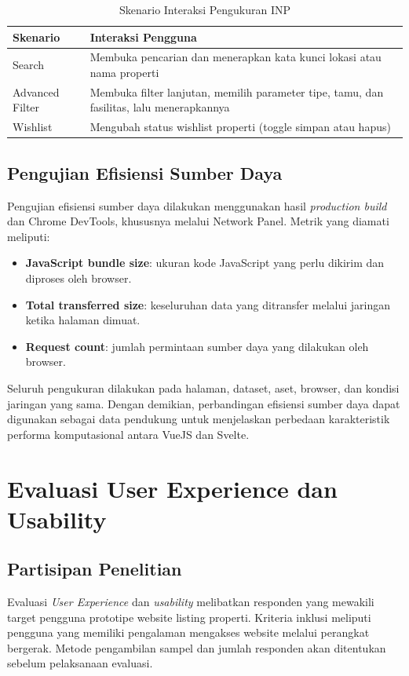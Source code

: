 \documentclass[12pt,a4paper]{report}
\begin{document}
\begin{table}[H]
\centering
\caption{Skenario Interaksi Pengukuran INP}
\label{tab:skenario-inp}
\begin{tabularx}{0.92\textwidth}{|L{3.5cm}|Y|}
\hline
\textbf{Skenario} & \textbf{Interaksi Pengguna} \\
\hline
Search & Membuka pencarian dan menerapkan kata kunci lokasi atau nama properti \\
\hline
Advanced Filter & Membuka filter lanjutan, memilih parameter tipe, tamu, dan fasilitas, lalu menerapkannya \\
\hline
Wishlist & Mengubah status wishlist properti (toggle simpan atau hapus) \\
\hline
\end{tabularx}
\end{table}

\subsection{Pengujian Efisiensi Sumber Daya}
\label{sec:pengujian-efisiensi}
Pengujian efisiensi sumber daya dilakukan menggunakan hasil \textit{production build} dan Chrome DevTools, khususnya melalui Network Panel. Metrik yang diamati meliputi:
\begin{itemize}
    \item \textbf{JavaScript bundle size}: ukuran kode JavaScript yang perlu dikirim dan diproses oleh browser.
    \item \textbf{Total transferred size}: keseluruhan data yang ditransfer melalui jaringan ketika halaman dimuat.
    \item \textbf{Request count}: jumlah permintaan sumber daya yang dilakukan oleh browser.
\end{itemize}

Seluruh pengukuran dilakukan pada halaman, dataset, aset, browser, dan kondisi jaringan yang sama. Dengan demikian, perbandingan efisiensi sumber daya dapat digunakan sebagai data pendukung untuk menjelaskan perbedaan karakteristik performa komputasional antara VueJS dan Svelte.

\section{Evaluasi User Experience dan Usability}
\label{sec:evaluasi-ux-usability}

\subsection{Partisipan Penelitian}
\label{sec:partisipan}
Evaluasi \textit{User Experience} dan \textit{usability} melibatkan responden yang mewakili target pengguna prototipe website listing properti. Kriteria inklusi meliputi pengguna yang memiliki pengalaman mengakses website melalui perangkat bergerak. Metode pengambilan sampel dan jumlah responden akan ditentukan sebelum pelaksanaan evaluasi.
\end{document}
